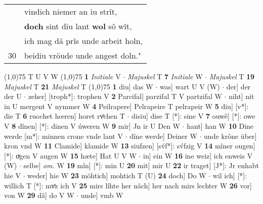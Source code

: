 \documentclass[8pt,a4paper,notitlepage]{article}
\begin{document}
\begin{table}[ht]
\begin{minipage}[t]{0.5\linewidth}
\begin{tabular}{rl}
 & vindich niemer an iu strît,\\ 
 & \textbf{doch} sint diu lant \textbf{wol} sô wît,\\ 
 & ich mag dâ prîs unde arbeit holn,\\ 
30 & beidiu vröude unde angest doln."\\ 
\end{tabular}
\scriptsize
\line(1,0){75} \newline
T U V W \newline
\line(1,0){75} \newline
\textbf{1} \textit{Initiale} V   $\cdot$ \textit{Majuskel} T  \textbf{7} \textit{Initiale} W   $\cdot$ \textit{Majuskel} T  \textbf{19} \textit{Majuskel} T  \textbf{21} \textit{Majuskel} T  \newline
\line(1,0){75} \newline
\textbf{1} diu] das W  $\cdot$ was] wart U V (W)  $\cdot$ der] der der U  $\cdot$ zeher] [troph*]: trophen V \textbf{2} Parcifal] parzifal T V partzifal W  $\cdot$ niht] nit in U mergent V nymmer W \textbf{4} Peilrapere] Pelrapeire T pelrapeir W \textbf{5} diu] [v*]: die T \textbf{6} ruochet hœren] horet rvͦchen T  $\cdot$ disiu] dise T [*]: sine V \textbf{7} ouwê] [*]: owe V \textbf{8} dînen] [*]: dinen V úweren W \textbf{9} mir] Jn ir U Den W  $\cdot$ hant] han W \textbf{10} Dine werde [m*]: minnen crone vnde lant V  $\cdot$ dîne werde] Deiner W  $\cdot$ unde krône über] kron vnd W \textbf{11} Clamide] klamide W \textbf{13} siufzen] [sv́f*]: sv́fzig V \textbf{14} mîner ougen] [*]: oͮgen V augen W \textbf{15} hæte] Hat U V W  $\cdot$ in] ein W \textbf{16} ine weiz] ich enweis V (W)  $\cdot$ selbe] \textit{om.} W \textbf{19} mîn] [*]: min U \textbf{20} mit] mir U \textbf{22} ir traget] [J*]: Jr enhabt hie V  $\cdot$ weder] hie W \textbf{23} möhtich] mohtich T (U) \textbf{24} doch] Do W  $\cdot$ wil ich] [*]: willich T [*]: mvͦz ich V \textbf{25} mirs lîhte her nâch] her nach mirs lechter W \textbf{26} vor] von W \textbf{29} dâ] do V W  $\cdot$ unde] vmb W \newline
\end{minipage}
\end{table}
\end{document}
